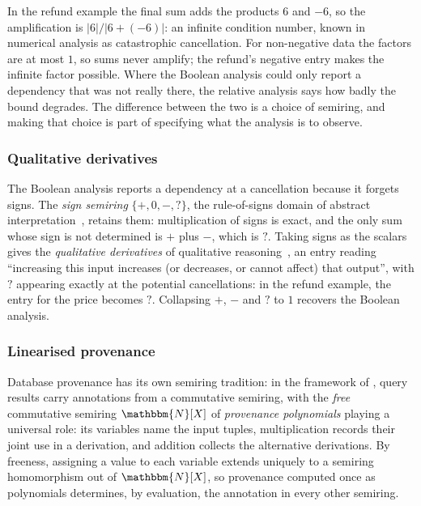In the refund example the final sum adds the products $6$ and $-6$, so the amplification is $|6| / |6 +
(-6)|$: an infinite condition number, known in numerical analysis as catastrophic cancellation. For
non-negative data the factors are at most $1$, so sums never amplify; the refund's negative entry makes the
infinite factor possible. Where the Boolean analysis could only report a dependency that was not really
there, the relative analysis says how badly the bound degrades. The difference between the two is a choice of
semiring, and making that choice is part of specifying what the analysis is to observe.

\subsubsection{Qualitative derivatives}
\label{sec:approx-as-tangents:qualitative}

The Boolean analysis reports a dependency at a cancellation because it forgets signs. The \emph{sign
semiring} $\{+, 0, -, ?\}$, the rule-of-signs domain of abstract interpretation~\cite{cousot77}, retains
them: multiplication of signs is exact, and the only sum whose sign is not determined is $+$ plus $-$, which
is $?$. Taking signs as the scalars gives the \emph{qualitative derivatives} of qualitative
reasoning~\cite{dekleer84,kuipers86}, an entry reading ``increasing this input increases (or decreases, or
cannot affect) that output'', with $?$ appearing exactly at the potential cancellations: in the refund
example, the entry for the price becomes $?$. Collapsing $+$, $-$ and $?$ to $1$ recovers the Boolean
analysis.

\subsubsection{Linearised provenance}
\label{sec:approx-as-tangents:linearised-provenance}

Database provenance has its own semiring tradition: in the framework of
\citet{green07}, query results carry annotations from a commutative semiring, with the \emph{free}
commutative semiring $\mathbbm{N}[X]$ of \emph{provenance polynomials} playing a universal role: its
variables name the input tuples, multiplication records their joint use in a derivation, and addition
collects the alternative derivations. By freeness, assigning a value to each variable extends uniquely to a
semiring homomorphism out of $\mathbbm{N}[X]$, so provenance computed once as polynomials determines, by
evaluation, the annotation in every other semiring.

